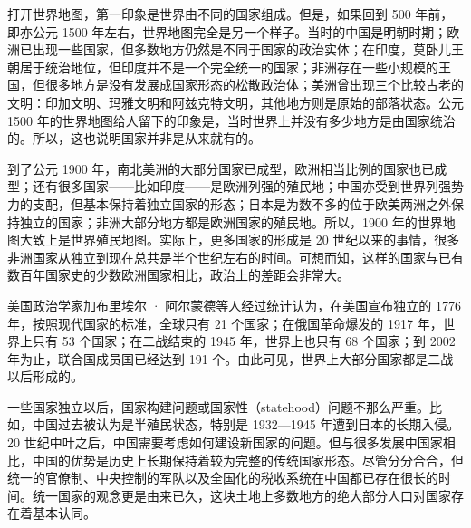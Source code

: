 





打开世界地图，第一印象是世界由不同的国家组成。但是，如果回到 500 年前，即亦公元 1500 年左右，世界地图完全是另一个样子。当时的中国是明朝时期；欧洲已出现一些国家，但多数地方仍然是不同于国家的政治实体；在印度，莫卧儿王朝居于统治地位，但印度并不是一个完全统一的国家；非洲存在一些小规模的王国，但很多地方是没有发展成国家形态的松散政治体；美洲曾出现三个比较古老的文明：印加文明、玛雅文明和阿兹克特文明，其他地方则是原始的部落状态。公元 1500 年的世界地图给人留下的印象是，当时世界上并没有多少地方是由国家统治的。所以，这也说明国家并非是从来就有的。

到了公元 1900 年，南北美洲的大部分国家已成型，欧洲相当比例的国家也已成型；还有很多国家——比如印度——是欧洲列强的殖民地；中国亦受到世界列强势力的支配，但基本保持着独立国家的形态；日本是为数不多的位于欧美两洲之外保持独立的国家；非洲大部分地方都是欧洲国家的殖民地。所以，1900 年的世界地图大致上是世界殖民地图。实际上，更多国家的形成是 20 世纪以来的事情，很多非洲国家从独立到现在总共是半个世纪左右的时间。可想而知，这样的国家与已有数百年国家史的少数欧洲国家相比，政治上的差距会非常大。

美国政治学家加布里埃尔 · 阿尔蒙德等人经过统计认为，在美国宣布独立的 1776 年，按照现代国家的标准，全球只有 21 个国家；在俄国革命爆发的 1917 年，世界上只有 53 个国家；在二战结束的 1945 年，世界上也只有 68 个国家；到 2002 年为止，联合国成员国已经达到 191 个。由此可见，世界上大部分国家都是二战以后形成的。

一些国家独立以后，国家构建问题或国家性（statehood）问题不那么严重。比如，中国过去被认为是半殖民状态，特别是 1932—1945 年遭到日本的长期入侵。20 世纪中叶之后，中国需要考虑如何建设新国家的问题。但与很多发展中国家相比，中国的优势是历史上长期保持着较为完整的传统国家形态。尽管分分合合，但统一的官僚制、中央控制的军队以及全国化的税收系统在中国都已存在很长的时间。统一国家的观念更是由来已久，这块土地上多数地方的绝大部分人口对国家存在着基本认同。

